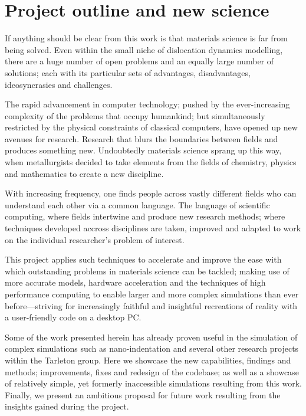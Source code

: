 \section{Project outline and new science}
\label{s:objectives}

If anything should be clear from this work is that materials science is far from being solved. Even within the small niche of dislocation dynamics modelling, there are a huge number of open problems and an equally large number of solutions; each with its particular sets of advantages, disadvantages, ideosyncrasies and challenges.

The rapid advancement in computer technology; pushed by the ever-increasing complexity of the problems that occupy humankind; but simultaneously restricted by the physical constraints of classical computers, have opened up new avenues for research. Research that blurs the boundaries between fields and produces something new. Undoubtedly materials science sprang up this way, when metallurgists decided to take elements from the fields of chemistry, physics and mathematics to create a new discipline.

With increasing frequency, one finds people across vastly different fields who can understand each other via a common language. The language of scientific computing, where fields intertwine and produce new research methods; where techniques developed accross disciplines are taken, improved and adapted to work on the individual researcher's problem of interest.

This project applies such techniques to accelerate and improve the ease with which outstanding problems in materials science can be tackled; making use of more accurate models, hardware acceleration and the techniques of high performance computing to enable larger and more complex simulations than ever before---striving for increasingly faithful and insightful recreations of reality with a user-friendly code on a desktop PC.

Some of the work presented herein has already proven useful in the simulation of complex simulations such as nano-indentation \cite{YU2018} and several other research projects within the Tarleton group. Here we showcase the new capabilities, findings and methods; improvements, fixes and redesign of the codebase; as well as a showcase of relatively simple, yet formerly inaccessible simulations resulting from this work. Finally, we present an ambitious proposal for future work resulting from the insights gained during the project.
\savearabiccounter
